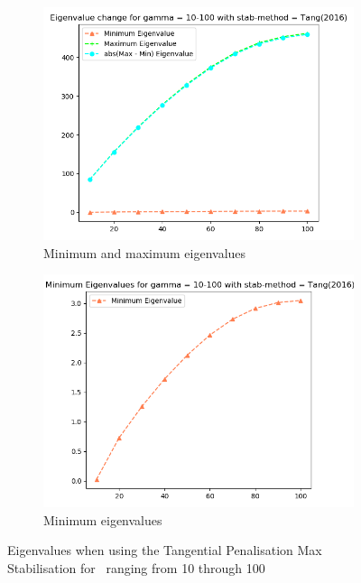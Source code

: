 \begin{figure}[ht]
     \centering
     \begin{subfigure}[h]{0.49\textwidth}
        \centering
\includegraphics[width=\textwidth]{latex/Thesis/media/Gamma_10_thru_100_tang(2016).png}
\caption{Minimum and maximum eigenvalues\label{fig:TangMaxEigHigh}}
     \end{subfigure}
     \hfill
     \begin{subfigure}[h]{0.49\textwidth}
\centering
\includegraphics[width=\textwidth]{latex/Thesis/media/Gamma_10_thru_100_tang(2016)_min.png}
\caption{Minimum eigenvalues\label{fig:TangMaxEigHighMin}}
     \end{subfigure}
        \caption{Eigenvalues when using the Tangential Penalisation Max Stabilisation for \mgamma~ranging from 10 through 100}
        \label{fig:TangMaxEigHighmulti}
\end{figure}




